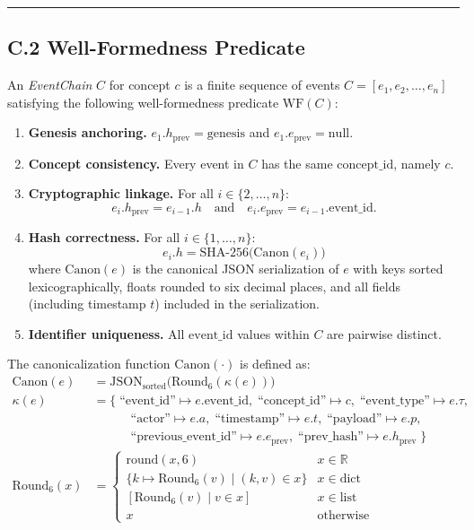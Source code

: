 \begin{center}\rule{0.5\linewidth}{0.5pt}\end{center}


\subsection{C.2 Well-Formedness Predicate}\label{c.2-well-formedness-predicate}

An \emph{EventChain} $C$ for concept $c$ is a finite sequence of events $C = [e_1, e_2, \ldots, e_n]$ satisfying the following well-formedness predicate $\text{WF}(C)$:

\begin{enumerate}
\def\labelenumi{\arabic{enumi}.}
\tightlist
\item
  \textbf{Genesis anchoring.} $e_1.h_{\text{prev}} = \text{genesis}$ and $e_1.e_{\text{prev}} = \text{null}$.
\item
  \textbf{Concept consistency.} Every event in $C$ has the same $\text{concept\_id}$, namely $c$.
\item
  \textbf{Cryptographic linkage.} For all $i \in \{2, \ldots, n\}$:
  \[
  e_i.h_{\text{prev}} = e_{i-1}.h \quad \text{and} \quad e_i.e_{\text{prev}} = e_{i-1}.\text{event\_id}.
  \]
\item
  \textbf{Hash correctness.} For all $i \in \{1, \ldots, n\}$:
  \[
  e_i.h = \text{SHA-256}\bigl(\text{Canon}(e_i)\bigr)
  \]
  where $\text{Canon}(e)$ is the canonical JSON serialization of $e$ with keys sorted lexicographically, floats rounded to six decimal places, and all fields (including timestamp $t$) included in the serialization.
\item
  \textbf{Identifier uniqueness.} All $\text{event\_id}$ values within $C$ are pairwise distinct.
\end{enumerate}

The canonicalization function $\text{Canon}(\cdot)$ is defined as:
\begin{align}
\text{Canon}(e) &= \text{JSON}_{\text{sorted}}\bigl(\text{Round}_6(\kappa(e))\bigr) \\
\kappa(e) &= \{\; \text{``event\_id''} \mapsto e.\text{event\_id},\; \text{``concept\_id''} \mapsto c,\; \text{``event\_type''} \mapsto e.\tau, \nonumber \\
&\qquad\quad \text{``actor''} \mapsto e.a,\; \text{``timestamp''} \mapsto e.t,\; \text{``payload''} \mapsto e.p, \nonumber \\
&\qquad\quad \text{``previous\_event\_id''} \mapsto e.e_{\text{prev}},\; \text{``prev\_hash''} \mapsto e.h_{\text{prev}} \;\} \\
\text{Round}_6(x) &=
  \begin{cases}
  \text{round}(x, 6) & x \in \mathbb{R} \\
  \{k \mapsto \text{Round}_6(v) \mid (k,v) \in x\} & x \in \text{dict} \\
  [\text{Round}_6(v) \mid v \in x] & x \in \text{list} \\
  x & \text{otherwise}
  \end{cases}
\end{align}

